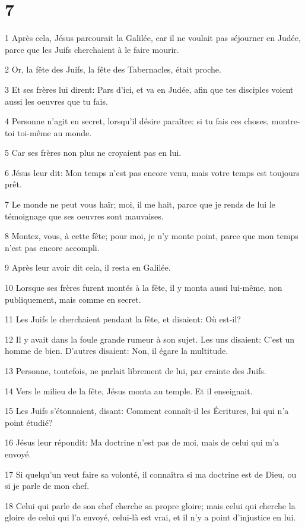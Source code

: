 \chapter{7}

\par 1 Après cela, Jésus parcourait la Galilée, car il ne voulait pas séjourner en Judée, parce que les Juifs cherchaient à le faire mourir.
\par 2 Or, la fête des Juifs, la fête des Tabernacles, était proche.
\par 3 Et ses frères lui dirent: Pars d'ici, et va en Judée, afin que tes disciples voient aussi les oeuvres que tu fais.
\par 4 Personne n'agit en secret, lorsqu'il désire paraître: si tu fais ces choses, montre-toi toi-même au monde.
\par 5 Car ses frères non plus ne croyaient pas en lui.
\par 6 Jésus leur dit: Mon temps n'est pas encore venu, mais votre temps est toujours prêt.
\par 7 Le monde ne peut vous haïr; moi, il me hait, parce que je rends de lui le témoignage que ses oeuvres sont mauvaises.
\par 8 Montez, vous, à cette fête; pour moi, je n'y monte point, parce que mon temps n'est pas encore accompli.
\par 9 Après leur avoir dit cela, il resta en Galilée.
\par 10 Lorsque ses frères furent montés à la fête, il y monta aussi lui-même, non publiquement, mais comme en secret.
\par 11 Les Juifs le cherchaient pendant la fête, et disaient: Où est-il?
\par 12 Il y avait dans la foule grande rumeur à son sujet. Les uns disaient: C'est un homme de bien. D'autres disaient: Non, il égare la multitude.
\par 13 Personne, toutefois, ne parlait librement de lui, par crainte des Juifs.
\par 14 Vers le milieu de la fête, Jésus monta au temple. Et il enseignait.
\par 15 Les Juifs s'étonnaient, disant: Comment connaît-il les Écritures, lui qui n'a point étudié?
\par 16 Jésus leur répondit: Ma doctrine n'est pas de moi, mais de celui qui m'a envoyé.
\par 17 Si quelqu'un veut faire sa volonté, il connaîtra si ma doctrine est de Dieu, ou si je parle de mon chef.
\par 18 Celui qui parle de son chef cherche sa propre gloire; mais celui qui cherche la gloire de celui qui l'a envoyé, celui-là est vrai, et il n'y a point d'injustice en lui.
